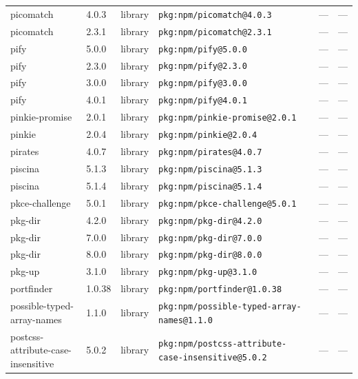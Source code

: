 \documentclass[11pt,a4paper]{article}
\begin{document}
\begin{longtable}{|p{4cm}|p{2cm}|p{1.6cm}|p{5cm}|p{1.5cm}|p{3.5cm}|}
\raggedright picomatch & 4.0.3 & library & \small\texttt{pkg:npm/picomatch@4.0.3} & — & \small — \\
\raggedright picomatch & 2.3.1 & library & \small\texttt{pkg:npm/picomatch@2.3.1} & — & \small — \\
\raggedright pify & 5.0.0 & library & \small\texttt{pkg:npm/pify@5.0.0} & — & \small — \\
\raggedright pify & 2.3.0 & library & \small\texttt{pkg:npm/pify@2.3.0} & — & \small — \\
\raggedright pify & 3.0.0 & library & \small\texttt{pkg:npm/pify@3.0.0} & — & \small — \\
\raggedright pify & 4.0.1 & library & \small\texttt{pkg:npm/pify@4.0.1} & — & \small — \\
\raggedright pinkie-promise & 2.0.1 & library & \small\texttt{pkg:npm/pinkie-promise@2.0.1} & — & \small — \\
\raggedright pinkie & 2.0.4 & library & \small\texttt{pkg:npm/pinkie@2.0.4} & — & \small — \\
\raggedright pirates & 4.0.7 & library & \small\texttt{pkg:npm/pirates@4.0.7} & — & \small — \\
\raggedright piscina & 5.1.3 & library & \small\texttt{pkg:npm/piscina@5.1.3} & — & \small — \\
\raggedright piscina & 5.1.4 & library & \small\texttt{pkg:npm/piscina@5.1.4} & — & \small — \\
\raggedright pkce-challenge & 5.0.1 & library & \small\texttt{pkg:npm/pkce-challenge@5.0.1} & — & \small — \\
\raggedright pkg-dir & 4.2.0 & library & \small\texttt{pkg:npm/pkg-dir@4.2.0} & — & \small — \\
\raggedright pkg-dir & 7.0.0 & library & \small\texttt{pkg:npm/pkg-dir@7.0.0} & — & \small — \\
\raggedright pkg-dir & 8.0.0 & library & \small\texttt{pkg:npm/pkg-dir@8.0.0} & — & \small — \\
\raggedright pkg-up & 3.1.0 & library & \small\texttt{pkg:npm/pkg-up@3.1.0} & — & \small — \\
\raggedright portfinder & 1.0.38 & library & \small\texttt{pkg:npm/portfinder@1.0.38} & — & \small — \\
\raggedright possible-typed-array-names & 1.1.0 & library & \small\texttt{pkg:npm/possible-typed-array-names@1.1.0} & — & \small — \\
\raggedright postcss-attribute-case-insensitive & 5.0.2 & library & \small\texttt{pkg:npm/postcss-attribute-case-insensitive@5.0.2} & — & \small — \\

\end{longtable}
\end{document}
